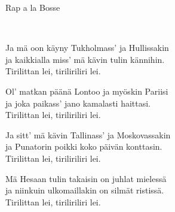 \begin{song}{Rap a la Bosse}
	
	
	\\
	

    \showversenumber	
	Ja mä oon käyny Tukholmass' ja Hullissakin\\
	ja kaikkialla miss' mä kävin tulin kännihin.\\
	Tirilittan lei, tiriliriliri lei.
	
    \showversenumber
	Ol' matkan päänä Lontoo ja myöskin Pariisi\\
	ja joka paikass' jano kamalasti haittasi.\\
	Tirilittan lei, tiriliriliri lei.
	
    \showversenumber
	Ja sitt' mä kävin Tallinass' ja Moskovassakin\\
	ja Punatorin poikki koko päivän konttasin.\\
	Tirilittan lei, tiriliriliri lei.
	
    \showversenumber
	Mä Hesaan tulin takaisin on juhlat mielessä\\
	ja niinkuin ulkomaillakin on silmät ristissä.\\
	Tirilittan lei, tiriliriliri lei.
	
\end{song}
